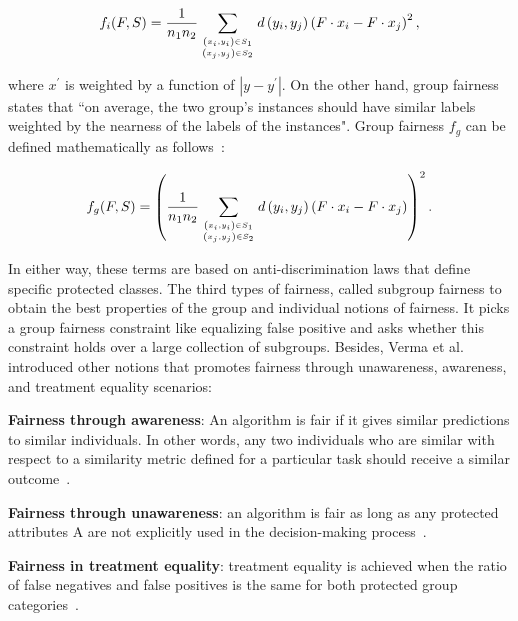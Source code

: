 \vspace{-4mm}
\begin{align}
    f_{i}(F, S)=\frac{1}{n_{1} n_{2}} \sum_{\left(x_{i}, y_{i}\right) \in S_{1} \atop\left(x_{j}, y_{j}\right) \in S_{2}} d\left(y_{i}, y_{j}\right)\left(F \cdot x_{i}-F \cdot x_{j}\right)^{2},
\end{align}
\vspace{-4mm}

\hspace*{3.5mm} where $x^{\prime}$ is weighted by a function of $\left|y-y^{\prime}\right|$. On the other hand, group fairness states that ``on average, the two group's instances should have similar labels weighted by the nearness of the labels of the instances". Group fairness $f_g$ can be defined mathematically as follows~\cite{berk2017convex}: 

\vspace{-4mm}
\begin{align}
    f_{g}(F, S)=\left(\frac{1}{n_{1} n_{2}} \sum_{\left(x_{i}, y_{i}\right) \in S_{1} \atop\left(x_{j}, y_{j}\right) \in S_{2}} d\left(y_{i}, y_{j}\right)\left(F \cdot x_{i}-F \cdot x_{j}\right)\right)^{2}.
\end{align}
\vspace{-4mm}

\hspace*{3.5mm} In either way, these terms are based on anti-discrimination laws that define specific protected classes.
The third types of fairness, called subgroup fairness to obtain the best properties of the group and individual notions of fairness. It picks a group fairness constraint like equalizing false positive and asks whether this constraint holds over a large collection of subgroups. Besides, Verma et al.\cite{verma2018fairness} introduced other notions that promotes fairness through unawareness, awareness, and treatment equality scenarios:    

\begin{definition}
    \textbf{Fairness through awareness}: An algorithm is fair if it gives similar predictions to similar individuals. In other words, any two individuals who are similar with respect to a similarity metric defined for a particular task should receive a similar outcome~\cite{verma2018fairness}.
\end{definition}
\vspace{-4mm}
\begin{definition}
    \textbf{Fairness through unawareness}: an algorithm is fair as long as any protected attributes A are not explicitly used in the decision-making process~\cite{verma2018fairness}.
\end{definition}
\vspace{-4mm}
\begin{definition}
    \textbf{Fairness in treatment equality}: treatment equality is achieved when the ratio of false negatives and false positives is the same for both protected group categories~\cite{verma2018fairness}.
\end{definition}

